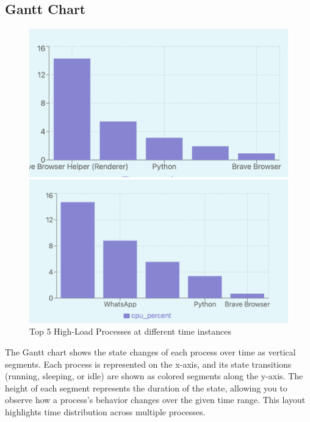 \documentclass[12pt]{article}
\begin{document}
\subsection{Gantt Chart}
\begin{figure}[H]
    \centering
    \begin{minipage}{0.45\textwidth}
        \centering
        \includegraphics[width=\textwidth]{logos and images/top5_1.png}
    \end{minipage}
    \hfill
    \begin{minipage}{0.45\textwidth}
        \centering
        \includegraphics[width=\textwidth]{logos and images/top5_2.png}
    \end{minipage}
    \caption{Top 5 High-Load Processes at different time instances}
\end{figure}

 The Gantt chart shows the state changes of each process over time as vertical segments. Each process is represented on the x-axis, and its state transitions (running, sleeping, or idle) are shown as colored segments along the y-axis. The height of each segment represents the duration of the state, allowing you to observe how a process's behavior changes over the given time range. This layout highlights time distribution across multiple processes.
\end{document}

